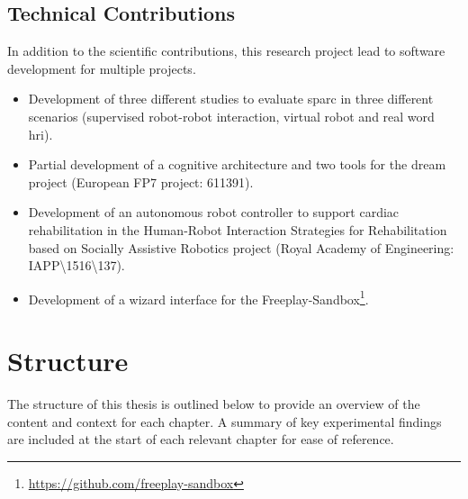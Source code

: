 \subsection{Technical Contributions}
In addition to the scientific contributions, this research project lead to software development for multiple projects.
\begin{itemize}
	\item Development of three different studies to evaluate \gls{sparc} in three different scenarios (supervised robot-robot interaction, virtual robot and real word \gls{hri}).
	\item Partial development of a cognitive architecture and two tools for the \acrshort{dream} project (European FP7 project: 611391).
	\item Development of an autonomous robot controller to support cardiac rehabilitation in the Human-Robot Interaction Strategies for Rehabilitation based on Socially Assistive Robotics project (Royal Academy of Engineering: IAPP\textbackslash1516\textbackslash137).
	\item Development of a wizard interface for the Freeplay-Sandbox\footnote{\url{https://github.com/freeplay-sandbox}}. 
\end{itemize}
	
\section{Structure}\label{sec:intro-struct}
The structure of this thesis is outlined below to provide an overview of the content and context for each chapter. A summary of key experimental findings are included at the start of each relevant chapter for ease of reference. 

